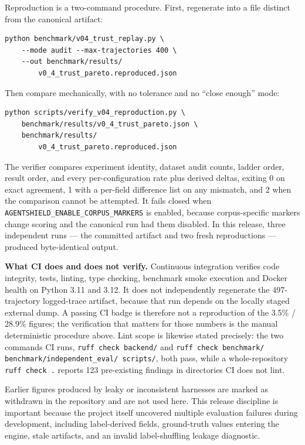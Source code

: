 \documentclass[letterpaper,twocolumn,10pt]{article}
\begin{document}
Reproduction is a two-command procedure. First, regenerate into a file distinct
from the canonical artifact:

{\small
\begin{verbatim}
python benchmark/v04_trust_replay.py \
    --mode audit --max-trajectories 400 \
    --out benchmark/results/
        v0_4_trust_pareto.reproduced.json
\end{verbatim}
}

Then compare mechanically, with no tolerance and no ``close enough'' mode:

{\small
\begin{verbatim}
python scripts/verify_v04_reproduction.py \
    benchmark/results/v0_4_trust_pareto.json \
    benchmark/results/
        v0_4_trust_pareto.reproduced.json
\end{verbatim}
}

The verifier compares experiment identity, dataset audit counts, ladder order,
result order, and every per-configuration rate plus derived deltas, exiting 0 on
exact agreement, 1 with a per-field difference list on any mismatch, and 2 when
the comparison cannot be attempted. It fails closed when
\texttt{AGENTSHIELD\_ENABLE\_CORPUS\_MARKERS} is enabled, because
corpus-specific markers change scoring and the canonical run had them disabled.
In this release, three independent runs --- the committed artifact and two fresh
reproductions --- produced byte-identical output.

\noindent\textbf{What CI does and does not verify.} Continuous integration
verifies code integrity, tests, linting, type checking, benchmark smoke
execution and Docker health on Python 3.11 and 3.12. It does not independently
regenerate the 497-trajectory logged-trace artifact, because that run depends
on the locally staged external dump. A passing CI badge is therefore not a
reproduction of the 3.5\% / 28.9\% figures; the verification that matters for
those numbers is the manual deterministic procedure above. Lint scope is
likewise stated precisely: the two commands CI runs, \texttt{ruff check
backend/} and \texttt{ruff check benchmark/}
\texttt{benchmark/independent\_eval/ scripts/}, both pass, while a
whole-repository \texttt{ruff check .} reports 123 pre-existing findings in
directories CI does not lint.

Earlier figures produced by leaky or inconsistent harnesses are marked as
withdrawn in the repository and are not used here. This release discipline is
important because the project itself uncovered multiple evaluation failures
during development, including label-derived fields, ground-truth values entering
the engine, stale artifacts, and an invalid label-shuffling leakage diagnostic.
\end{document}
